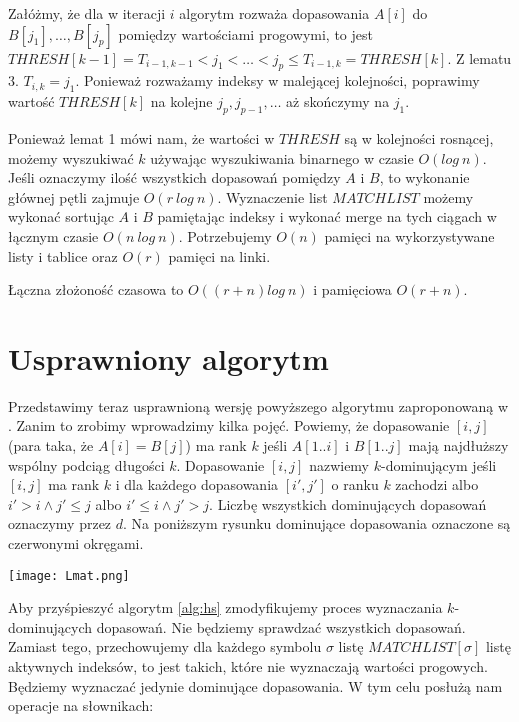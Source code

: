 \documentclass[11pt]{article}
\begin{document}
Załóżmy, że dla w iteracji $i$ algorytm rozważa dopasowania $A[i]$ do $B[j_1], \dots, B[j_p]$ pomiędzy wartościami progowymi, to jest $THRESH[k-1] = T_{i-1,k-1} < j_1 < \dots < j_p \le T_{i-1, k} = THRESH[k]$. Z lematu 3. $T_{i,k} = j_1$. Ponieważ rozważamy indeksy w malejącej kolejności, poprawimy wartość $THRESH[k]$ na kolejne $j_p, j_{p-1}, \dots$ aż skończymy na $j_1$.

Ponieważ lemat 1 mówi nam, że wartości w $THRESH$ są w kolejności rosnącej, możemy wyszukiwać $k$ używając wyszukiwania binarnego w czasie $O(log\ n)$. Jeśli oznaczymy ilość wszystkich dopasowań pomiędzy $A$ i $B$, to wykonanie głównej pętli zajmuje $O(r\ log\ n)$. Wyznaczenie list $MATCHLIST$ możemy wykonać sortując $A$ i $B$ pamiętając indeksy i wykonać merge na tych ciągach w łącznym czasie $O(n\ log\ n)$. Potrzebujemy $O(n)$ pamięci na wykorzystywane listy i tablice oraz $O(r)$ pamięci na linki. 

Łączna złożoność czasowa to $O((r+n)log\ n)$ i pamięciowa $O(r + n)$.

\clearpage

\section*{Usprawniony algorytm}

Przedstawimy teraz usprawnioną wersję powyższego algorytmu zaproponowaną w \cite{apostolico1986improving}. Zanim to zrobimy wprowadzimy kilka pojęć. Powiemy, że dopasowanie $[i,j]$ (para taka, że $A[i] = B[j]$) ma rank $k$ jeśli $A[1..i]$ i $B[1..j]$ mają najdłuższy wspólny podciąg długości $k$. Dopasowanie $[i, j]$ nazwiemy $k$-dominującym jeśli $[i, j]$ ma rank $k$ i dla każdego dopasowania $[i', j']$ o ranku $k$ zachodzi albo $i' > i \land j' \le j$ albo $i' \le i \land j' > j$. Liczbę wszystkich dominujących dopasowań oznaczymy przez $d$. Na poniższym rysunku dominujące dopasowania oznaczone są czerwonymi okręgami.

\begin{center}
    \texttt{[image: Lmat.png]}
\end{center}

Aby przyśpieszyć algorytm \ref{alg:hs} zmodyfikujemy proces wyznaczania $k$-dominujących dopasowań. Nie będziemy sprawdzać wszystkich dopasowań. Zamiast tego, przechowujemy dla każdego symbolu $\sigma$ listę $MATCHLIST[\sigma]$ listę aktywnych indeksów, to jest takich, które nie wyznaczają wartości progowych. Będziemy wyznaczać jedynie dominujące dopasowania. W tym celu posłużą nam operacje na słownikach:
\end{document}
